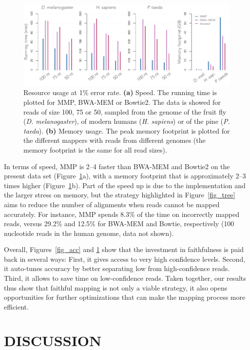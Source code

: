 \documentclass[a4,center,fleqn]{NAR}
\begin{document}
\begin{figure}[t]
\begin{center}
\includegraphics[scale=.58]{fig_timem.pdf}
\end{center}
\caption{Resource usage at 1\% error rate. \textbf{(a)} Speed. The running
time is plotted for MMP, BWA-MEM or Bowtie2. The data is showed for reads
of size 100, 75 or 50, sampled from the genome of the fruit fly
(\textit{D. melanogaster}), of modern humans (\textit{H. sapiens}) or of
the pine (\textit{P. taeda}). \textbf{(b)} Memory usage. The peak memory
footprint is plotted for the different mappers with reads from different
genomes (the memory footprint is the same for all read sizes).}
\label{fig_timem}
\end{figure}

In terms of speed, MMP is 2--4 faster than BWA-MEM and Bowtie2 on the
present data set (Figure~\ref{fig_timem}a), with a memory footprint that
is approximately 2--3 times higher (Figure~\ref{fig_timem}b). Part of the
speed up is due to the implementation and the larger stress on memory, but
the strategy highlighted in Figure~\ref{fig_tree} aims to reduce the
number of alignments when reads cannot be mapped accurately. For instance,
MMP spends 8.3\% of the time on incorrectly mapped reads, versus 29.2\%
and 12.5\% for BWA-MEM and Bowtie, respectively (100 nucleotide reads in
the human genome, data not shown).

Overall, Figures~\ref{fig_acc} and \ref{fig_timem} show that the
investment in faithfulness is paid back in several ways: First, it gives
access to very high confidence levels. Second, it auto-tunes accuracy by
better separating low from high-confidence reads. Third, it allows to save
time on low-confidence reads. Taken together, our results thus show that
faithful mapping is not only a viable strategy, it also opens
opportunities for further optimizations that can make the mapping process
more efficient.


\section{DISCUSSION}
\end{document}
